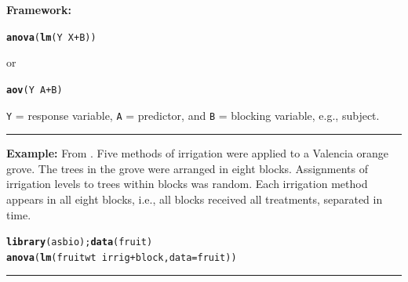 \documentclass[12pt,english]{article}\usepackage[]{graphicx}\usepackage[table]{xcolor}
\makeatletter
\newcommand{\hlopt}[1]{\textcolor[rgb]{0,0,0}{#1}}%
\newcommand{\hldef}[1]{\textcolor[rgb]{0.345,0.345,0.345}{#1}}%
\newcommand{\hlkwc}[1]{\textcolor[rgb]{0.333,0.667,0.333}{#1}}%
\newcommand{\hlkwd}[1]{\textcolor[rgb]{0.737,0.353,0.396}{\textbf{#1}}}%
\newenvironment{kframe}{%
 \def\at@end@of@kframe{}%
 \ifinner\ifhmode%
  \def\at@end@of@kframe{\end{minipage}}%
  \begin{minipage}{\columnwidth}%
 \fi\fi%
 \def\FrameCommand##1{\hskip\@totalleftmargin \hskip-\fboxsep
 \colorbox{shadecolor}{##1}\hskip-\fboxsep
     \hskip-\linewidth \hskip-\@totalleftmargin \hskip\columnwidth}%
 \MakeFramed {\advance\hsize-\width
   \@totalleftmargin\z@ \linewidth\hsize
   \@setminipage}}%
 {\par\unskip\endMakeFramed%
 \at@end@of@kframe}
\newenvironment{knitrout}{}{} %
\makeatother
\begin{document}
\begin{tcolorbox}[colback=yellow!50!red!25!white,colbacktitle=yellow!50!red,colframe=black!75!white,title=\textbf{R:} Repeated Measures as an RCBD]

\textbf{Framework:}\\
\vspace{-.2in}
\begin{knitrout}
\color{fgcolor}\begin{kframe}
\begin{alltt}
\hlkwd{anova}\hldef{(}\hlkwd{lm}\hldef{(Y} \hlopt{~} \hldef{X} \hlopt{+} \hldef{B))}
\end{alltt}
\end{kframe}
\end{knitrout}
\vspace{-.1in}
or
\vspace{-.1in}
\begin{knitrout}
\color{fgcolor}\begin{kframe}
\begin{alltt}
\hlkwd{aov}\hldef{(Y} \hlopt{~} \hldef{A} \hlopt{+} \hldef{B)}
\end{alltt}
\end{kframe}
\end{knitrout}
\texttt{Y} = response variable, \texttt{A} = predictor, and \texttt{B} = blocking variable, e.g., subject.
\vspace{0.1in}
\par\noindent\rule{.9\textwidth}{0.4pt}

\textbf{Example:} From \citep[][pg 63]{litt2002}.  Five methods of irrigation were applied to a Valencia orange grove.  The trees in the grove were arranged in eight blocks.  Assignments of irrigation levels to trees within blocks was random.  Each irrigation method appears in all eight blocks, i.e., all blocks received all treatments, separated in time.
\vspace{-.1in}
\begin{knitrout}
\color{fgcolor}\begin{kframe}
\begin{alltt}
\hlkwd{library}\hldef{(asbio);} \hlkwd{data}\hldef{(fruit)}
\hlkwd{anova}\hldef{(}\hlkwd{lm}\hldef{(fruitwt} \hlopt{~} \hldef{irrig} \hlopt{+} \hldef{block,} \hlkwc{data} \hldef{= fruit))}
\end{alltt}
\end{kframe}
\end{knitrout}
\end{tcolorbox}
\par\noindent\rule{.9\textwidth}{0.4pt}
\end{document}
